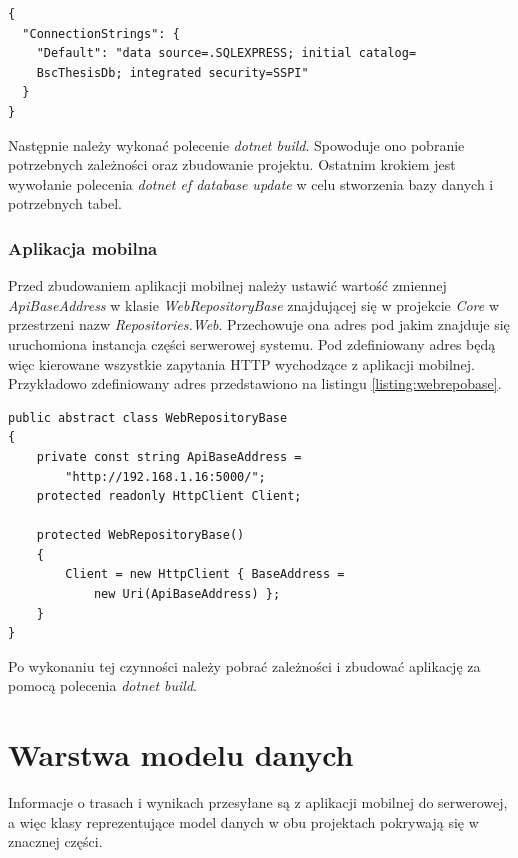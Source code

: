 \begin{lstlisting}[caption={Plik konfiguracyjny aplikacji serwerowej},label=listing:appsettings]
{
  "ConnectionStrings": {
    "Default": "data source=.SQLEXPRESS; initial catalog=
    BscThesisDb; integrated security=SSPI"
  }
}
\end{lstlisting}

Następnie należy wykonać polecenie \textit{dotnet build}. Spowoduje ono pobranie potrzebnych zależności oraz zbudowanie projektu. Ostatnim krokiem jest wywołanie polecenia \textit{dotnet ef database update} w celu stworzenia bazy danych i potrzebnych tabel.

\subsubsection{Aplikacja mobilna}
Przed zbudowaniem aplikacji mobilnej należy ustawić wartość zmiennej \textit{ApiBaseAddress} w klasie \textit{WebRepositoryBase} znajdującej się w projekcie \textit{Core} w przestrzeni nazw \textit{Repositories.Web}. Przechowuje ona adres pod jakim znajduje się uruchomiona instancja części serwerowej systemu. Pod zdefiniowany adres będą więc kierowane wszystkie zapytania HTTP wychodzące z aplikacji mobilnej. Przykładowo zdefiniowany adres przedstawiono na listingu \ref{listing:webrepobase}.

\begin{lstlisting}[caption={Klasa zawierająca adres aplikacji serwerowej},label=listing:webrepobase]
public abstract class WebRepositoryBase
{
	private const string ApiBaseAddress = 
		"http://192.168.1.16:5000/";
	protected readonly HttpClient Client;

	protected WebRepositoryBase()
	{
		Client = new HttpClient { BaseAddress =
			new Uri(ApiBaseAddress) };
	}
}
\end{lstlisting}

Po wykonaniu tej czynności należy pobrać zależności i zbudować aplikację za pomocą polecenia \textit{dotnet build}.


\section{Warstwa modelu danych}
Informacje o trasach i wynikach przesyłane są z aplikacji mobilnej do serwerowej, a więc klasy reprezentujące model danych w obu projektach pokrywają się w znacznej części.
